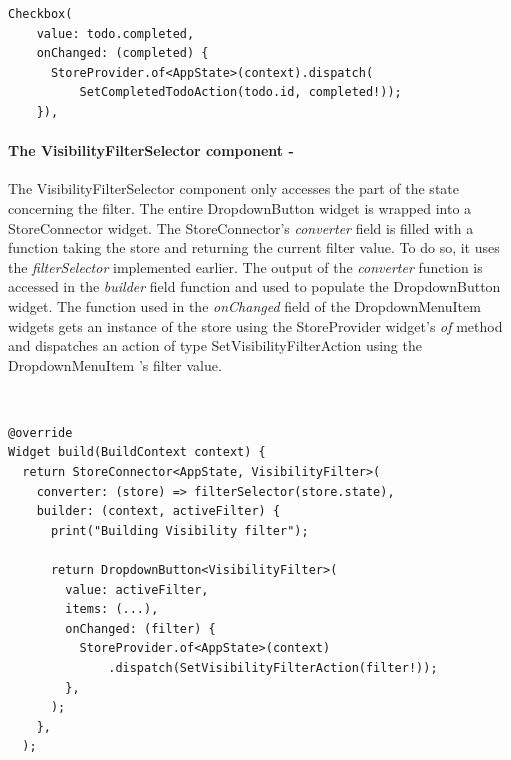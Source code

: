 \begin{code}
\mbox{}
 \mbox{}
		\label{code:2.14}
\begin{verbatim}
Checkbox(
    value: todo.completed,
    onChanged: (completed) {
      StoreProvider.of<AppState>(context).dispatch(
          SetCompletedTodoAction(todo.id, completed!));
    }),
\end{verbatim}
\mbox{}
\end{code}

\paragraph{The VisibilityFilterSelector component - }
\label{subpar:todo_app_bloc_core_state}
The VisibilityFilterSelector component only accesses the part of the state concerning the filter. The entire DropdownButton widget is wrapped into a StoreConnector widget. The StoreConnector’s \textit{converter} field  is filled with a function taking the store and returning the current filter value. To do so, it uses the \textit{filterSelector} implemented earlier. The output of the \textit{converter} function is accessed in the \textit{builder} field function and used to populate the DropdownButton widget. The function used in the \textit{onChanged} field of the DropdownMenuItem widgets gets an instance of the store using the StoreProvider widget’s \textit{of} method and dispatches an action of type SetVisibilityFilterAction using the DropdownMenuItem 's filter value.
\begin{code}
\mbox{}\\
 \mbox{}
		\label{code:2.14}
\begin{verbatim}
@override
Widget build(BuildContext context) {
  return StoreConnector<AppState, VisibilityFilter>(
    converter: (store) => filterSelector(store.state),
    builder: (context, activeFilter) {
      print("Building Visibility filter");

      return DropdownButton<VisibilityFilter>(
        value: activeFilter,
        items: (...),
        onChanged: (filter) {
          StoreProvider.of<AppState>(context)
              .dispatch(SetVisibilityFilterAction(filter!));
        },
      );
    },
  );
\end{verbatim}
\mbox{}
\end{code}

